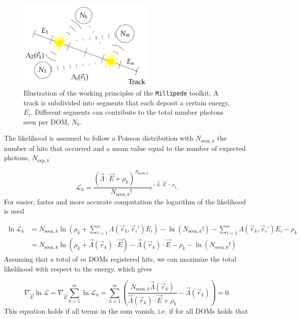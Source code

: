 \begin{figure}
\centering
\includegraphics[width=0.6\textwidth]{chapter7/img/millipede.png}
\caption{Illustration of the working principles of the \texttt{Millipede} toolkit. A track is subdivided into segments that each deposit a certain energy, $E_i$. Different segments can contribute to the total number photons seen per DOM, $N_k$.}
\label{fig:millipede}
\end{figure}

The likelihood is assumed to follow a Poisson distribution with $N_{\textrm{seen},k}$ the number of hits that occurred and a mean value equal to the number of expected photons, $N_{\textrm{exp},k}$

\begin{equation}
\mathcal{L}_k = \frac{\left(\vec{\Lambda} \cdot \vec{E} + \rho_k \right)^{N_{\textrm{seen},k}}}{N_{\textrm{seen},k}!} e^{-\vec{\Lambda} \cdot \vec{E} - \rho_k}.
\end{equation}
\noindent For easier, faster and more accurate computation the logarithm of the likelihood is used

\begin{equation}
\begin{split}
\ln \mathcal{L}_k &= N_{\textrm{seen},k} \ln \left(\rho_k + \sum^n_{i=1} \Lambda(\vec{r}_k,\vec{r}_i') E_i \right) - \ln \left(N_{\textrm{seen},k}!\right) - \sum^n_{i=1} \Lambda(\vec{r}_k,\vec{r}_i') E_i - \rho_k\\
&= N_{\textrm{seen},k} \ln \left(\rho_k + \vec{\Lambda}(\vec{r}_k) \cdot \vec{E} \right) - \vec{\Lambda}(\vec{r}_k) \cdot \vec{E} - \rho_k - \ln\left(N_{\textrm{seen},k}!\right)
\end{split}
\end{equation}
\noindent Assuming that a total of $m$ DOMs registered hits, we can maximize the total likelihood with respect to the energy, which gives 

\begin{equation}
\nabla_{\vec{E}} \ln \mathcal{L} = \nabla_{\vec{E}} \sum^m_{k=1} \ln \mathcal{L}_k = \sum^m_{k=1} \left(\frac{N_{\textrm{seen},k} \vec{\Lambda}(\vec{r}_k)}{\vec{\Lambda}(\vec{r}_k) \cdot \vec{E} + \rho_k} - \vec{\Lambda}(\vec{r}_k) \right) = 0.
\end{equation}
\noindent This equation holds if all terms in the sum vanish, i.e. if for all DOMs holds that

